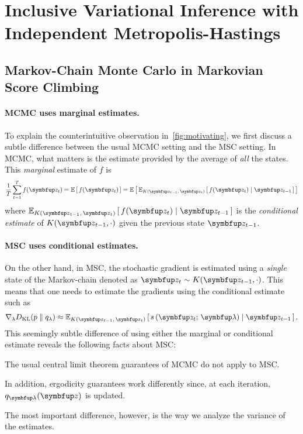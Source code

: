 
\section{Inclusive Variational Inference with Independent Metropolis-Hastings}
\subsection{Markov-Chain Monte Carlo in Markovian Score Climbing}\label{section:msc_mcmc}
\paragraph{MCMC uses marginal estimates.}
To explain the counterintuitive observation in~\cref{fig:motivating}, we first discuss a subtle difference between the usual MCMC setting and the MSC setting.
In MCMC, what matters is the estimate provided by the average of \textit{all} the states.
This \textit{marginal} estimate of \(f\) is 
\begin{align}
  \frac{1}{T} \sum^{T}_{t=1} f(\vz_t) = \E{f(\vz_t)} = \E{\Esub{K(\vz_{t-1},\,\vz_t)}{ f(\vz_t) \mid \vz_{t-1}}}
\end{align}
where \(\Esub{K(\vz_{t-1},\,\vz_{t})}{ f(\vz_t) \mid \vz_{t-1}}\) is the \textit{conditional estimate} of \(K(\vz_{t-1},\cdot)\) given the previous state \(\vz_{t-1}\).

\paragraph{MSC uses conditional estimates.}
On the other hand, in MSC, the stochastic gradient is estimated using a \textit{single} state of the Markov-chain denoted as \(\vz_t \sim K(\vz_{t-1}, \cdot)\).
This means that one needs to estimate the gradients using the conditional estimate such as
\begin{align}
  \nabla_{\lambda} \DKL{p}{q_{\lambda}} \approx \Esub{K(\vz_{t-1},\,\vz_t)}{s\,(\vz_t;\, \vlambda) \mid \vz_{t-1}}.
\end{align}
This seemingly subtle difference of using either the marginal or conditional estimate reveals the following facts about MSC:
\begin{enumerate*}[label=(\roman*)]
\item The usual central limit theorem guarantees of MCMC do not apply to MSC.
\item In addition, ergodicity guarantees work differently since, at each iteration, \(q_{\vlambda}(\vz)\) is updated.
\end{enumerate*}
The most important difference, however, is the way we analyze the variance of the estimates.

